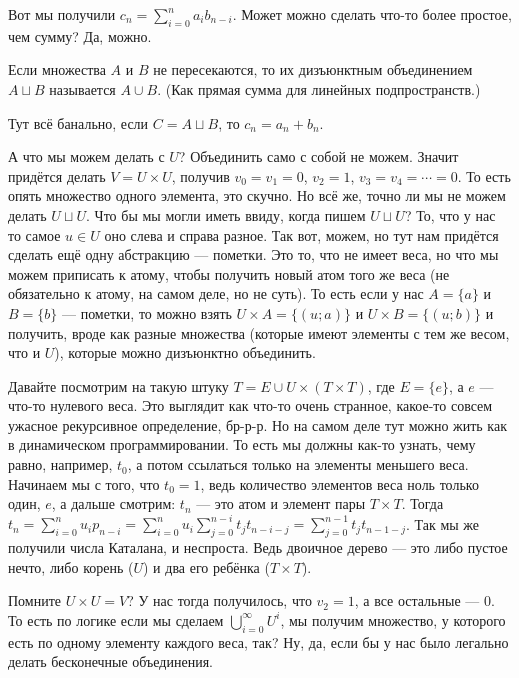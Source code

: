 \documentclass{article}
\begin{document}
\begin{itemize}
\begin{Comment}
            Вот мы получили $c_n=\sum_{i=0}^na_ib_{n-i}$. Может можно сделать что-то более простое, чем сумму? Да, можно.
        \end{Comment}
        \dfn Если множества $A$ и $B$ не пересекаются, то их дизъюнктным объединением $A\sqcup B$ называется $A\cup B$. (Как прямая сумма для линейных подпространств.)
        \begin{Comment}
            Тут всё банально, если $C=A\sqcup B$, то $c_n=a_n+b_n$.
        \end{Comment}
        \begin{Comment}
            А что мы можем делать с $U$? Объединить само с собой не можем. Значит придётся делать $V=U\times U$, получив $v_0=v_1=0$, $v_2=1$, $v_3=v_4=\cdots=0$. То есть опять множество одного элемента, это скучно. Но всё же, точно ли мы не можем делать $U\sqcup U$. Что бы мы могли иметь ввиду, когда пишем $U\sqcup U$? То, что у нас то самое $u\in U$ оно слева и справа разное. Так вот, можем, но тут нам придётся сделать ещё одну абстракцию --- пометки. Это то, что не имеет веса, но что мы можем приписать к атому, чтобы получить новый атом того же веса (не обязательно к атому, на самом деле, но не суть). То есть если у нас $A=\{a\}$ и $B=\{b\}$ --- пометки, то можно взять $U\times A=\{(u;a)\}$ и $U\times B=\{(u;b)\}$ и получить, вроде как разные множества (которые имеют элементы с тем же весом, что и $U$), которые можно дизъюнктно объединить.
        \end{Comment}
        \begin{Comment}
            Давайте посмотрим на такую штуку $T=E\cup U\times(T\times T)$, где $E=\{e\}$, а $e$ --- что-то нулевого веса. Это выглядит как что-то очень странное, какое-то совсем ужасное рекурсивное определение, бр-р-р. Но на самом деле тут можно жить как в динамическом программировании. То есть мы должны как-то узнать, чему равно, например, $t_0$, а потом ссылаться только на элементы меньшего веса. Начинаем мы с того, что $t_0=1$, ведь количество элементов веса ноль только один, $e$, а дальше смотрим: $t_n$ --- это атом и элемент пары $T\times T$. Тогда $t_n=\sum\limits_{i=0}^nu_ip_{n-i}=\sum\limits_{i=0}^nu_i\sum\limits_{j=0}^{n-i}t_jt_{n-i-j}=\sum\limits_{j=0}^{n-1}t_jt_{n-1-j}$. Так мы же получили числа Каталана, и неспроста. Ведь двоичное дерево --- это либо пустое нечто, либо корень ($U$) и два его ребёнка ($T\times T$).
        \end{Comment}
        \begin{Comment}
            Помните $U\times U=V$? У нас тогда получилось, что $v_2=1$, а все остальные --- 0. То есть по логике если мы сделаем $\bigcup\limits_{i=0}^\infty U^i$, мы получим множество, у которого есть по одному элементу каждого веса, так? Ну, да, если бы у нас было легально делать бесконечные объединения.

\end{Comment}
\end{itemize}
\end{document}
